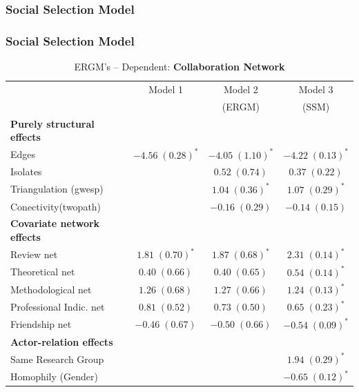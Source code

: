 \documentclass[compress]{beamer}
\begin{document}
\subsubsection{Social Selection Model}
\begin{frame}
	\frametitle{Social Selection Model}
	
	\begin{table}[!h]
			\centering
			\tiny
			\caption{ERGM's -- Dependent: \textbf{Collaboration Network}}
			\label{ergm_colab}
		
		\begin{tabular}{l c c c }
				\hline
				& Model 1 & Model 2 & Model 3 \\
				&         & (ERGM) & (SSM) \\
				\hline
				\textbf{Purely structural effects} & & & \\
				Edges  				  & $-4.56 \; (0.28)^{*}$ & $-4.05 \; (1.10)^{*}$ & $-4.22 \; (0.13)^{*}$ \\
				Isolates              &                         & $0.52 \; (0.74)$        & $0.37 \; (0.22)$        \\
				Triangulation (gwesp) &                         & $1.04 \; (0.36)^{*}$   & $1.07 \; (0.29)^{*}$  \\
				Conectivity(twopath)  &                         & $-0.16 \; (0.29)$       & $-0.14 \; (0.15)$       \\
				\textbf{Covariate network effects} & & & \\
				Review net            & $1.81 \; (0.70)^{*}$   & $1.87 \; (0.68)^{*}$   & $2.31 \; (0.14)^{*}$  \\
				Theoretical net       & $0.40 \; (0.66)$        & $0.40 \; (0.65)$        & $0.54 \; (0.14)^{*}$  \\
				Methodological net    & $1.26 \; (0.68)$        & $1.27 \; (0.66)$        & $1.24 \; (0.13)^{*}$  \\
				Professional Indic. net & $0.81 \; (0.52)$        & $0.73 \; (0.50)$        & $0.65 \; (0.23)^{*}$   \\
				Friendship net        & $-0.46 \; (0.67)$       & $-0.50 \; (0.66)$       & $-0.54 \; (0.09)^{*}$ \\
				\textbf{Actor-relation effects} & & & \\
				Same Research Group        &                         &                    & $1.94 \; (0.29)^{*}$  \\
				Homophily (Gender)        &                         &                     & $-0.65 \; (0.12)^{*}$ \\

\end{tabular}
\end{table}
\end{frame}
\end{document}
